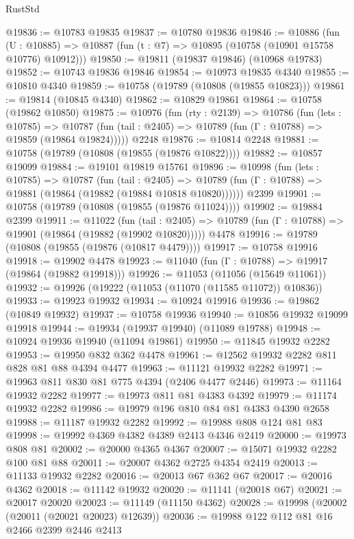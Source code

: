 \begin{lexlean}{RustStd}
\begin{coremodule}
@19836 := @10783 @19835
@19837 := @10780 @19836
@19846 := @10886
    (fun (U : @10885) => @10887 (fun (t : @7) => @10895 (@10758 (@10901 @15758 @10776) @10912)))
@19850 := @19811 (@19837 @19846) (@10968 @19783)
@19852 := @10743 @19836 @19846
@19854 := @10973 @19835 @4340
@19855 := @10810 @4340
@19859 := @10758 (@19789 (@10808 (@19855 @10823)))
@19861 := @19814 (@10845 @4340)
@19862 := @10829 @19861
@19864 := @10758 (@19862 @10850)
@19875 := @10976
    (fun (rty : @2139) =>
    @10786
      (fun (lets : @10785) =>
      @10787 (fun (tail : @2405) => @10789 (fun (Γ : @10788) => @19859 (@19864 @19824)))))
    @2248
@19876 := @10814 @2248
@19881 := @10758 (@19789 (@10808 (@19855 (@19876 @10822))))
@19882 := @10857 @19099
@19884 := @19101 @19819 @15761
@19896 := @10998
    (fun (lets : @10785) =>
    @10787
      (fun (tail : @2405) =>
      @10789 (fun (Γ : @10788) => @19881 (@19864 (@19882 (@19884 @10818 @10820))))))
    @2399
@19901 := @10758 (@19789 (@10808 (@19855 (@19876 @11024))))
@19902 := @19884 @2399
@19911 := @11022
    (fun (tail : @2405) => @10789 (fun (Γ : @10788) => @19901 (@19864 (@19882 (@19902 @10820)))))
    @4478
@19916 := @19789 (@10808 (@19855 (@19876 (@10817 @4479))))
@19917 := @10758 @19916
@19918 := @19902 @4478
@19923 := @11040 (fun (Γ : @10788) => @19917 (@19864 (@19882 @19918)))
@19926 := @11053 (@11056 (@15649 @11061))
@19932 := @19926 (@19222 (@11053 (@11070 (@11585 @11072)) @10836))
@19933 := @19923 @19932
@19934 := @10924 @19916
@19936 := @19862 (@10849 @19932)
@19937 := @10758 @19936
@19940 := @10856 @19932 @19099 @19918
@19944 := @19934 (@19937 @19940) (@11089 @19788)
@19948 := @10924 @19936 @19940 (@11094 @19861)
@19950 := @11845 @19932 @2282
@19953 := @19950 @832 @362 @4478
@19961 := @12562 @19932 @2282 @811 @828 @81 @88 @4394 @4477
@19963 := @11121 @19932 @2282
@19971 := @19963 @811 @830 @81 @775 @4394 (@2406 @4477 @2446)
@19973 := @11164 @19932 @2282
@19977 := @19973 @811 @81 @4383 @4392
@19979 := @11174 @19932 @2282
@19986 := @19979 @196 @810 @84 @81 @4383 @4390 @2658
@19988 := @11187 @19932 @2282
@19992 := @19988 @808 @124 @81 @83
@19998 := @19992 @4369 @4382 @4389 @2413 @4346 @2419
@20000 := @19973 @808 @81
@20002 := @20000 @4365 @4367
@20007 := @15071 @19932 @2282 @100 @81 @88
@20011 := @20007 @4362 @2725 @4354 @2419
@20013 := @11133 @19932 @2282
@20016 := @20013 @67 @362 @67
@20017 := @20016 @4362
@20018 := @11142 @19932
@20020 := @11141 (@20018 @67)
@20021 := @20017 @20020
@20023 := @11149 (@11150 @4362)
@20028 := @19998 (@20002 (@20011 (@20021 @20023) @12639))
@20036 := @19988 @122 @112 @81 @16 @2466 @2399 @2446 @2413

\end{coremodule}
\end{lexlean}
